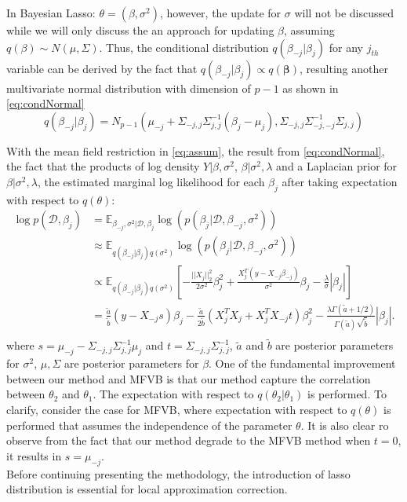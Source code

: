In Bayesian Lasso: $\theta = (\beta,\sigma^2)$, however, the update for $\sigma$ will not be discussed while we will only discuss the an approach for updating $\beta$, assuming $q(\beta) \sim N(\mu,\Sigma)$. Thus,
the conditional distribution $q(\beta_{-j}|\beta_{j})$ for any $j_{th}$ variable can be derived by the fact that $q(\beta_{-j}|\beta_{j}) \propto q(\mathbf{\beta})$, resulting another multivariate normal distribution with dimension of $p-1$ as shown in \autoref{eq:condNormal}
\begin{equation}
	\label{eq:condNormal}
	q(\beta_{-j}|\beta_{j}) = N_{p-1}(\mu_{-j}+\Sigma_{-j,j}\Sigma_{j,j}^{-1}(\beta_j-\mu_j), \Sigma_{-j,j} \Sigma_{-j,-j}^{-1}\Sigma_{j,j})
\end{equation}





With the mean field restriction in \autoref{eq:assum}, the result from \autoref{eq:condNormal}, the fact that the products of log density $Y|\beta,\sigma^2$, $\beta|\sigma^2,\lambda$ and a Laplacian prior for $\beta|\sigma^2,\lambda$, the estimated marginal log likelihood for each $\beta_j$ after taking expectation with respect to $q(\theta)$:
\begin{equation}
	\label{eq:MarLike}
	\begin{aligned}
		\log p(\mathcal{D},\beta_j) &= \mathbb{E}_{\beta_{-j},\sigma^2|\mathcal{D},\beta_j} 	\log(p(\beta_j|\mathcal{D},\beta_{-j},\sigma^2))\\
		& \approx \mathbb{E}_{q(\beta_{-j}|\beta_j)q(\sigma^2)}
		 \log(p(\beta_j|\mathcal{D},\beta_{-j},\sigma^2))\\
		& \propto \mathbb{E}_{q(\beta_{-j}|\beta_j)q(\sigma^2)}[-\frac{||X_j||_2^2}{2\sigma^2}\beta_j^2 + \frac{X_j^T(y - X_{-j}\beta_{-j})}{\sigma^2}\beta_j - \frac{\lambda}{\sigma}|\beta_j|]\\
		&= \frac{\tilde{a}}{\tilde{b}}(y - X_{-j}s)\beta_j - \frac{\tilde{a}}{2\tilde{b}}(X_j^TX_j+X_j^TX_{-j}t)\beta_j^2 - \frac{\lambda \Gamma(\tilde{a}+1/2)}{\Gamma(\tilde{a})\sqrt{\tilde{b}}}|\beta_j|.\\
	\end{aligned}
\end{equation}
where $s = \mu_{-j} - \Sigma_{-j,j}\Sigma_{j,j}^{-1}\mu_j$ and $t = \Sigma_{-j,j}\Sigma_{j,j}^{-1}$, $\tilde{a}$ and $\tilde{b}$ are posterior parameters for $\sigma^2$, $\mu,\Sigma$ are posterior parameters for $\beta$.
One of the fundamental improvement between our method and MFVB is that our method capture the correlation between $\theta_2$ and $\theta_1$. The expectation with respect to $q(\theta_2|\theta_1)$ is performed. To clarify, consider the case for MFVB, where expectation with respect to $q(\theta)$ is performed that assumes the independence of the parameter $\theta$.
It is also clear ro observe from the fact that our method degrade to the MFVB method when $t = 0$, it results in $s = \mu_{-j}$.\\
Before continuing presenting the methodology, the introduction of lasso distribution is essential for local approximation correction.

